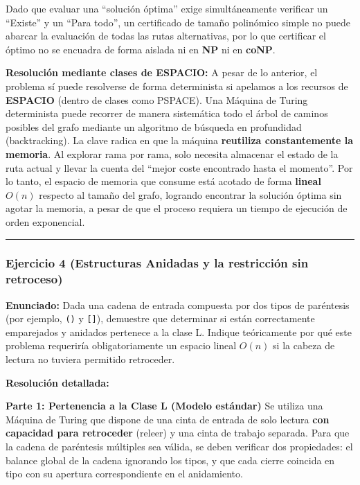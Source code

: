 \documentclass[12pt]{book} %
\begin{document}
Dado que evaluar una ``solución óptima'' exige simultáneamente verificar
un ``Existe'' y un ``Para todo'', un certificado de tamaño polinómico
simple no puede abarcar la evaluación de todas las rutas alternativas,
por lo que certificar el óptimo no se encuadra de forma aislada ni en
\textbf{NP} ni en \textbf{coNP}.

\textbf{Resolución mediante clases de ESPACIO:} A pesar de lo anterior,
el problema sí puede resolverse de forma determinista si apelamos a los
recursos de \textbf{ESPACIO} (dentro de clases como PSPACE). Una Máquina
de Turing determinista puede recorrer de manera sistemática todo el
árbol de caminos posibles del grafo mediante un algoritmo de búsqueda en
profundidad (backtracking). La clave radica en que la máquina
\textbf{reutiliza constantemente la memoria}. Al explorar rama por rama,
solo necesita almacenar el estado de la ruta actual y llevar la cuenta
del ``mejor coste encontrado hasta el momento''. Por lo tanto, el
espacio de memoria que consume está acotado de forma \textbf{lineal
\(O(n)\)} respecto al tamaño del grafo, logrando encontrar la solución
óptima sin agotar la memoria, a pesar de que el proceso requiera un
tiempo de ejecución de orden exponencial.

\begin{center}\rule{0.5\linewidth}{0.5pt}\end{center}

\hypertarget{ejercicio-4-estructuras-anidadas-y-la-restricciuxf3n-sin-retroceso}{%
\subsubsection{Ejercicio 4 (Estructuras Anidadas y la restricción sin
retroceso)}\label{ejercicio-4-estructuras-anidadas-y-la-restricciuxf3n-sin-retroceso}}

\textbf{Enunciado:} Dada una cadena de entrada compuesta por dos tipos
de paréntesis (por ejemplo, \texttt{()} y \texttt{{[}{]}}), demuestre
que determinar si están correctamente emparejados y anidados pertenece a
la clase L. Indique teóricamente por qué este problema requeriría
obligatoriamente un espacio lineal \(O(n)\) si la cabeza de lectura no
tuviera permitido retroceder.

\textbf{Resolución detallada:}

\textbf{Parte 1: Pertenencia a la Clase L (Modelo estándar)} Se utiliza
una Máquina de Turing que dispone de una cinta de entrada de solo
lectura \textbf{con capacidad para retroceder} (releer) y una cinta de
trabajo separada. Para que la cadena de paréntesis múltiples sea válida,
se deben verificar dos propiedades: el balance global de la cadena
ignorando los tipos, y que cada cierre coincida en tipo con su apertura
correspondiente en el anidamiento.
\end{document}
